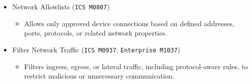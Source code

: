 \documentclass[10pt,a4paper,oneside]{report}
\begin{document}
\begin{itemize}
\begin{itemize}
\begin{itemize}
\item Requires devices and software processes to authenticate, especially for remote connections and API access.
\end{itemize}
\item Network Allowlists (\texttt{ICS M0807})
\begin{itemize}
\item Allows only approved device connections based on defined addresses, ports, protocols, or related network properties.
\end{itemize}
\item Filter Network Traffic (\texttt{ICS M0937}; \texttt{Enterprise M1037})
\begin{itemize}
\item Filters ingress, egress, or lateral traffic, including protocol-aware rules, to restrict malicious or unnecessary communication.
\end{itemize}
\end{itemize}
\end{itemize}
\end{document}
